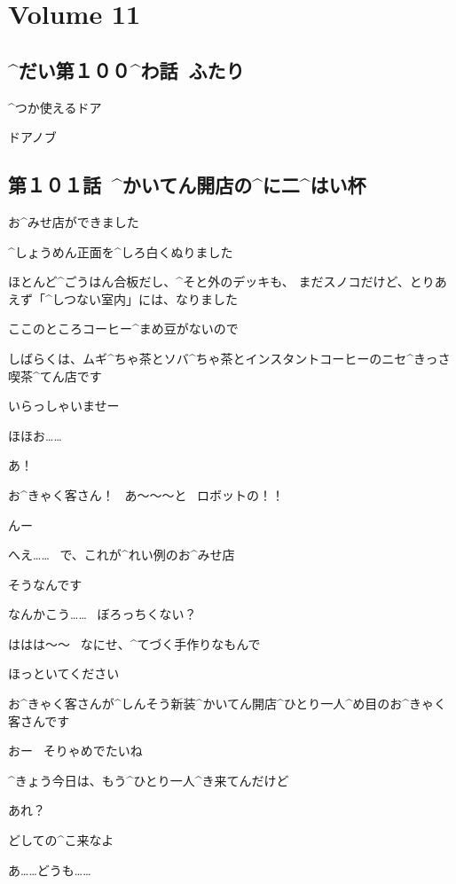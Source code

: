 \section{Volume 11}

\subsection{^{だい}{第}１００^{わ}{話}\ ふたり}

\page[3]
\Sign ^{つか}{使}えるドア

\Sign ドアノブ


\subsection{第１０１話\ ^{かいてん}{開店}の^{に}{二}^{はい}{杯}}

\page[10]
\A お^{みせ}{店}ができました

\A ^{しょうめん}{正面}を^{しろ}{白}くぬりました

\page
\A ほとんど^{ごうはん}{合板}だし、^{そと}{外}のデッキも、
まだスノコだけど、とりあえず「^{しつない}{室内}」には、なりました

\A ここのところコーヒー^{まめ}{豆}がないので

\A しばらくは、ムギ^{ちゃ}{茶}とソバ^{ちゃ}{茶}とインスタントコーヒーのニセ^{きっさ}{喫茶}^{てん}{店}です

\page[14]
\A いらっしゃいませー

\R ほほお……

\A あ！

\A お^{きゃく}{客}さん！
\ あ〜〜〜と
\ ロボットの！！

\R んー

\R へえ……
\ で、これが^{れい}{例}のお^{みせ}{店}

\A そうなんです

\page
\R なんかこう……
\ ぼろっちくない？

\A ははは〜〜
\ なにせ、^{てづく}{手作}りなもんで

\A ほっといてください

\A お^{きゃく}{客}さんが^{しんそう}{新装}^{かいてん}{開店}^{ひとり}{一人}^{め}{目}のお^{きゃく}{客}さんです

\R おー
\ そりゃめでたいね

\R ^{きょう}{今日}は、もう^{ひとり}{一人}^{き}{来}てんだけど

\R あれ？

\R どしての^{こ}{来}なよ

\page
\K あ……どうも……

